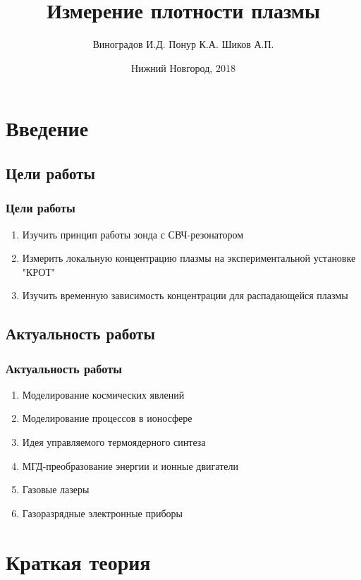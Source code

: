 \documentclass[10pt,pdf,hyperref={unicode}, dvipsnames]{beamer}
\title[Измерение плотности плазмы]{Измерение плотности плазмы}
\author{%
	Виноградов И.Д. %
	Понур К.А. %
	Шиков А.П. %
}
\institute{Радиофизический факультет ННГУ, 430 группа}
\date{Нижний Новгород, 2018}
\begin{document}
  

\section{Введение}
\subsection{Цели работы}
\begin{frame}[t]
	\frametitle{Цели работы}
		\vfill
		\begin{enumerate}
			\item Изучить принцип работы зонда с СВЧ-резонатором

			\item Измерить локальную концентрацию плазмы на экспериментальной установке "КРОТ"

			\item Изучить временную зависимость концентрации для распадающейся плазмы  

		\end{enumerate}
		\vfill
\end{frame}
\subsection{Актуальность работы}
\begin{frame}[t]
	
	\frametitle{Актуальность работы}
		
		\begin{enumerate}
			\item Моделирование космических явлений
			\item Моделирование процессов в ионосфере
			\item Идея управляемого термоядерного синтеза
			\item МГД-преобразование энергии и ионные двигатели
			\item Газовые лазеры
			\item Газоразрядные электронные приборы 
		\end{enumerate}


\end{frame}

\section{Краткая теория}
\end{document}
